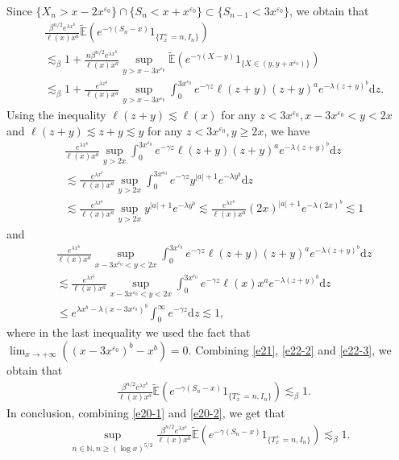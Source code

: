 \documentclass[11pt]{article}
\numberwithin{equation}{section}
\begin{document}
Since $\{X_n> x-2x^{\varepsilon_0}\}\cap  \{S_n<x+x^{\varepsilon_0}\}\subset \{S_{n-1} <3x^{\varepsilon_0}\}$, we obtain that 
\begin{align}\label{e21}
		& \frac{ \beta^{n/2} e^{\lambda x^b}}{\ell(x) x^a }  \widetilde{\mathbb{E}}\left(e^{-\gamma (S_n-x)}1_{\{T_x^+=n, I_n\}}\right)  \nonumber\\
	& \lesssim_\beta  1+  \frac{ n \beta^{n/2} e^{\lambda x^b}}{\ell(x) x^a } \sup_{y>x-3x^{\varepsilon_0}} \widetilde{\mathbb{E}}\left(e^{-\gamma (X-y)}1_{\{X\in (y, y+x^{\varepsilon_0}) \}}\right) \nonumber\\
	& \lesssim_\beta 1+  \frac{ e^{\lambda x^b}}{ \ell(x) x^a } \sup_{y>x-3x^{\varepsilon_0}}  \int_0^{3x^{\varepsilon_0}}e^{-\gamma z} \ell(z+y)(z+y)^a e^{-\lambda (z+y)^b} \mathrm{d}z. 
\end{align}
Using the inequality $\ell(z+y) \lesssim \ell(x)$ for any $z<3x^{\varepsilon_0}, x-3x^{\varepsilon_0}<y<2x$ and $\ell(z+y)\lesssim z+y \lesssim y$ for any $z<3x^{\varepsilon_0}, y\geq 2x$, we have 
\begin{align}\label{e22-2}
	&  \frac{ e^{\lambda x^b}}{ \ell(x) x^a }  \sup_{y>2x} \int_0^{3x^{\varepsilon_0}} e^{-\gamma z} \ell(z+y) (z+y)^{a} e^{-\lambda (z+y)^b} \mathrm{d}z\nonumber\\
	& \lesssim  \frac{ e^{\lambda x^b}}{ \ell(x) x^a } \sup_{y>2x} \int_0^{3x^{\varepsilon_0}} e^{-\gamma z}   y^{|a|+1} e^{-\lambda y^b} \mathrm{d}z\nonumber\\
	&\lesssim  \frac{ e^{\lambda x^b}}{ \ell(x) x^a }  \sup_{y>2x}    y^{|a|+1} e^{-\lambda y^b}  \lesssim \frac{e^{\lambda x^b}}{\ell(x) x^a }   (2x)^{|a|+1} e^{-\lambda (2x)^b}  \lesssim 1
\end{align}
and 
\begin{align}\label{e22-3}
	&  \frac{ e^{\lambda x^b}}{ \ell(x) x^a } \sup_{x-3x^{\varepsilon_0}<y<2x} \int_0^{3x^{\varepsilon_0}} e^{-\gamma z} \ell(z+y) (z+y)^{a} e^{-\lambda (z+y)^b} \mathrm{d}z\nonumber\\
	&\lesssim  \frac{ e^{\lambda x^b}}{ \ell(x) x^a } \sup_{x-3x^{\varepsilon_0}<y<2x} \int_0^{3x^{\varepsilon_0}} e^{-\gamma z} \ell(x) x^{a} e^{-\lambda (z+y)^b} \mathrm{d}z \nonumber\\
	& \leq e^{\lambda x^b-\lambda (x-3x^{\varepsilon_0})^b}    \int_0^{\infty} e^{-\gamma z} \mathrm{d}z \lesssim 1,
\end{align}
where in the last inequality we used the fact that $\lim_{x\to+\infty} ((x-3x^{\varepsilon_0})^b-x^b)=0$.
Combining \eqref{e21}, \eqref{e22-2} and \eqref{e22-3}, we obtain that 
\begin{align}\label{e20-2}
		& \frac{ \beta^{n/2} e^{\lambda x^b}}{\ell(x) x^a }   \widetilde{\mathbb{E}}\left(e^{-\gamma (S_n-x)}1_{\{T_x^+=n, I_n\}}\right) \lesssim_\beta 1.
\end{align}
In conclusion, combining \eqref{e20-1} and \eqref{e20-2}, we get that 
\begin{align}\label{e20}
	\sup_{n \in \mathbb{N}, n \geq  (\log x)^{5/2}} \frac{ \beta^{n/2} e^{\lambda x^b}}{\ell(x) x^a }   \widetilde{\mathbb{E}}\left(e^{-\gamma (S_n-x)}1_{\{T_x^+=n, I_n\}}\right)   \lesssim_\beta  1.
\end{align}
\end{document}
